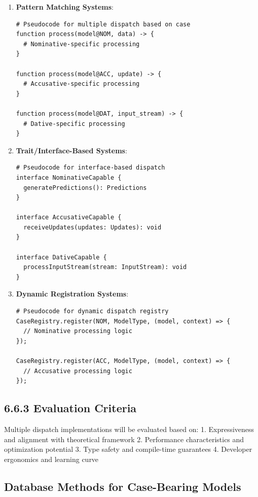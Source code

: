 \documentclass[
  11pt,
  letterpaper,
]{article}
\begin{document}
\begin{enumerate}
\def\labelenumi{\arabic{enumi}.}
\item
  \textbf{Pattern Matching Systems}:

\begin{verbatim}
# Pseudocode for multiple dispatch based on case
function process(model@NOM, data) -> { 
  # Nominative-specific processing
}

function process(model@ACC, update) -> {
  # Accusative-specific processing 
}

function process(model@DAT, input_stream) -> {
  # Dative-specific processing
}
\end{verbatim}
\item
  \textbf{Trait/Interface-Based Systems}:

\begin{verbatim}
# Pseudocode for interface-based dispatch
interface NominativeCapable {
  generatePredictions(): Predictions
}

interface AccusativeCapable {
  receiveUpdates(updates: Updates): void
}

interface DativeCapable {
  processInputStream(stream: InputStream): void
}
\end{verbatim}
\item
  \textbf{Dynamic Registration Systems}:

\begin{verbatim}
# Pseudocode for dynamic dispatch registry
CaseRegistry.register(NOM, ModelType, (model, context) => {
  // Nominative processing logic
});

CaseRegistry.register(ACC, ModelType, (model, context) => {
  // Accusative processing logic
});
\end{verbatim}
\end{enumerate}

\hypertarget{evaluation-criteria-1}{%
\subsection{6.6.3 Evaluation Criteria}\label{evaluation-criteria-1}}

Multiple dispatch implementations will be evaluated based on: 1.
Expressiveness and alignment with theoretical framework 2. Performance
characteristics and optimization potential 3. Type safety and
compile-time guarantees 4. Developer ergonomics and learning curve

\hypertarget{database-methods-for-case-bearing-models}{%
\subsection{Database Methods for Case-Bearing
Models}\label{database-methods-for-case-bearing-models}}
\end{document}
